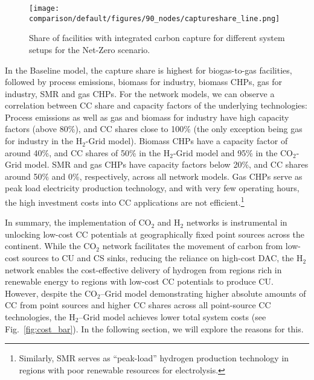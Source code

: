 \documentclass[twocolumn]{article}
\newcommand{\carbon}{CO$_2$}
\newcommand{\hydrogen}{H$_2$}
\newcommand{\carbongrid}{\carbon{}--Grid}
\newcommand{\hydrogengrid}{\hydrogen{}--Grid}
\newcommand{\modBase}{Baseline model}
\newcommand{\modCO}{CO$_2$-Grid model}
\newcommand{\modH}{H$_2$-Grid model}
\begin{document}
\begin{figure}[h]
    \centering
    \texttt{[image: comparison/default/figures/90\_nodes/captureshare\_line.png]}
    \caption{Share of facilities with integrated carbon capture for different system setups for the Net-Zero scenario.}
    \label{fig:captureshare_line}
\end{figure}%


In the \modBase{}, the capture share is highest for biogas-to-gas facilities, followed by process emissions, biomass for industry, biomass CHPs, gas for industry, SMR and gas CHPs. For the network models, we can observe a correlation between CC share and capacity factors of the underlying technologies: Process emissions as well as gas and biomass for industry have high capacity factors (above 80\%), and CC shares close to 100\% (the only exception being gas for industry in the \modH{}). Biomass CHPs have a capacity factor of around 40\%, and CC shares of 50\% in the \modH{} and 95\% in the \modCO{}. SMR and gas CHPs have capacity factors below 20\%, and CC shares around 50\% and 0\%, respectively, across all network models. Gas CHPs serve as peak load electricity production technology, and with very few operating hours, the high investment costs into CC applications are not efficient.\footnote[1]{Similarly, SMR serves as ``peak-load'' hydrogen production technology in regions with poor renewable resources for electrolysis.}


In summary, the implementation of \carbon{} and \hydrogen{} networks is instrumental in unlocking low-cost CC potentials at geographically fixed point sources across the continent. While the \carbon{} network facilitates the movement of carbon from low-cost sources to CU and CS sinks, reducing the reliance on high-cost DAC, the \hydrogen{} network enables the cost-effective delivery of hydrogen from regions rich in renewable energy to regions with low-cost CC potentials to produce CU. However, despite the \carbongrid{} model demonstrating higher absolute amounts of CC from point sources and higher CC shares across all point-source CC technologies, the \hydrogengrid{} model achieves lower total system costs (see Fig.~\ref{fig:cost_bar}). In the following section, we will explore the reasons for this.
\end{document}
